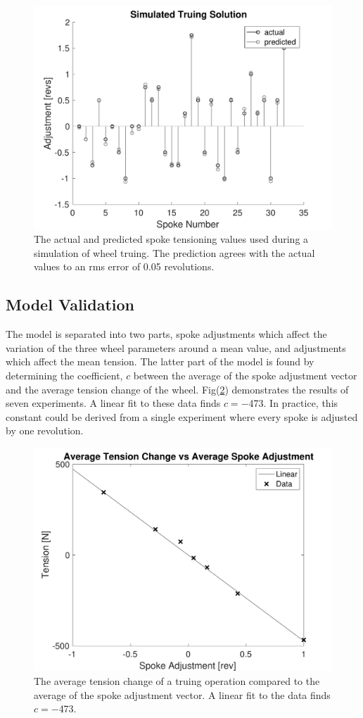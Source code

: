 \documentclass[journal]{IEEEtran}
\begin{document}
\begin{figure}[!t]
\centering
\includegraphics[width=3.25 in]{./figs/simd}
\caption{The actual and predicted spoke tensioning values used during a simulation of wheel truing.  The prediction agrees with the actual values to an rms error of 0.05 revolutions.}
\label{fig:simd}
\end{figure}

\subsection{Model Validation}
The model is separated into two parts, spoke adjustments which affect the variation of the three wheel parameters around a mean value, and adjustments which affect the mean tension.  The latter part of the model is found by determining the coefficient, $c$ between the average of the spoke adjustment vector and the average tension change of the wheel.  Fig(\ref{fig:c}) demonstrates the results of seven experiments. A linear fit to these data finds $c=-$473. In practice, this constant could be derived from a single experiment where every spoke is adjusted by one revolution. 

 \begin{figure}[!t]
\centering
\includegraphics[width=3.25 in]{./figs/c}
\caption{The average tension change of a truing operation compared to the average of the spoke adjustment vector. A linear fit to the data  finds $c=-$473.}
\label{fig:c}
\end{figure}
\end{document}
